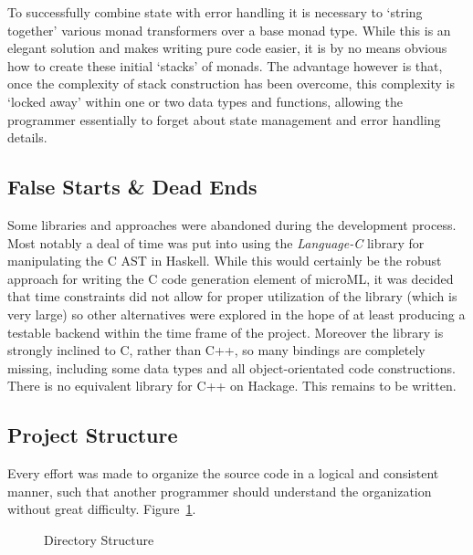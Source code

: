 \documentclass[12pt, a4paper]{report}
\begin{document}
To successfully combine state with error handling it is necessary to `string together' various monad
transformers over a base monad type. While this is an elegant solution and makes writing pure code
easier, it is by no means obvious how to create these initial `stacks' of monads. The advantage
however is that, once the complexity of stack construction has been overcome, this complexity is
`locked away' within one or two data types and functions, allowing the programmer essentially to
forget about state management and error handling details. 

\subsection{False Starts \& Dead Ends}
Some libraries and approaches were abandoned during the development process. Most notably a deal of
time was put into using the \textit{Language-C} library for manipulating the C AST in Haskell. While
this would certainly be the robust approach for writing the C code generation element of microML,
it was decided that time constraints did not allow for proper utilization of the library (which is
very large) so other alternatives were explored in the hope of at least producing a testable backend
within the time frame of the project. Moreover the library is strongly inclined to C, rather than
C++, so many bindings are completely missing, including some data types and all object-orientated
code constructions. There is no equivalent library for C++ on Hackage. This remains to be written. 

\subsection{Project Structure}
Every effort was made to organize the source code in a logical and consistent manner, such that
another programmer should understand the organization without great difficulty.
Figure~\ref{fig:dir}.

\begin{figure}
\caption{Directory Structure}
\label{fig:dir}
\end{figure}
\end{document}
